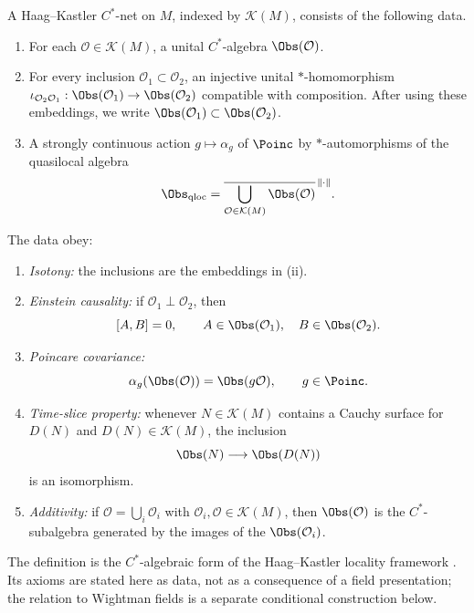 \begin{definition}
\label{def:haag-kastler-cstar-net}
A Haag--Kastler \(C^*\)-net on \(M\), indexed by \(\mathcal K(M)\), consists
of the following data.
\begin{enumerate}[label=\textup{(\roman*)}]
\item For each \(\mathcal O\in\mathcal K(M)\), a unital \(C^*\)-algebra
\(\Obs(\mathcal O)\).
\item For every inclusion \(\mathcal O_1\subset\mathcal O_2\), an injective
unital \(*\)-homomorphism
\(\iota_{\mathcal O_2\mathcal O_1}:\Obs(\mathcal O_1)\to\Obs(\mathcal O_2)\)
compatible with composition.  After using these embeddings, we write
\(\Obs(\mathcal O_1)\subset\Obs(\mathcal O_2)\).
\item A strongly continuous action \(g\mapsto\alpha_g\) of \(\Poinc\) by
\(*\)-automorphisms of the quasilocal algebra
\[
  \Obs_{\rm qloc}
  =
  \overline{\bigcup_{\mathcal O\in\mathcal K(M)}
  \Obs(\mathcal O)}^{\,\|\cdot\|}.
\]
\end{enumerate}
The data obey:
\begin{enumerate}[label=\textup{(HK\arabic*)}]
\item \emph{Isotony:} the inclusions are the embeddings in (ii).
\item \emph{Einstein causality:} if
\(\mathcal O_1\perp\mathcal O_2\), then
\[
  [A,B]=0,\qquad
  A\in\Obs(\mathcal O_1),\quad B\in\Obs(\mathcal O_2).
\]
\item \emph{Poincare covariance:}
\[
  \alpha_g(\Obs(\mathcal O))=\Obs(g\mathcal O),
  \qquad g\in\Poinc .
\]
\item \emph{Time-slice property:} whenever \(N\in\mathcal K(M)\) contains a
Cauchy surface for \(D(N)\) and \(D(N)\in\mathcal K(M)\), the inclusion
\[
  \Obs(N)\longrightarrow\Obs(D(N))
\]
is an isomorphism.
\item \emph{Additivity:} if
\(\mathcal O=\bigcup_i\mathcal O_i\) with
\(\mathcal O_i,\mathcal O\in\mathcal K(M)\), then
\(\Obs(\mathcal O)\) is the \(C^*\)-subalgebra generated by the images of the
\(\Obs(\mathcal O_i)\).
\end{enumerate}
\end{definition}

The definition is the \(C^*\)-algebraic form of the Haag--Kastler locality
framework \cite{HaagKastler1964}.  Its axioms are stated here as data, not as
a consequence of a field presentation; the relation to Wightman fields is a
separate conditional construction below.


